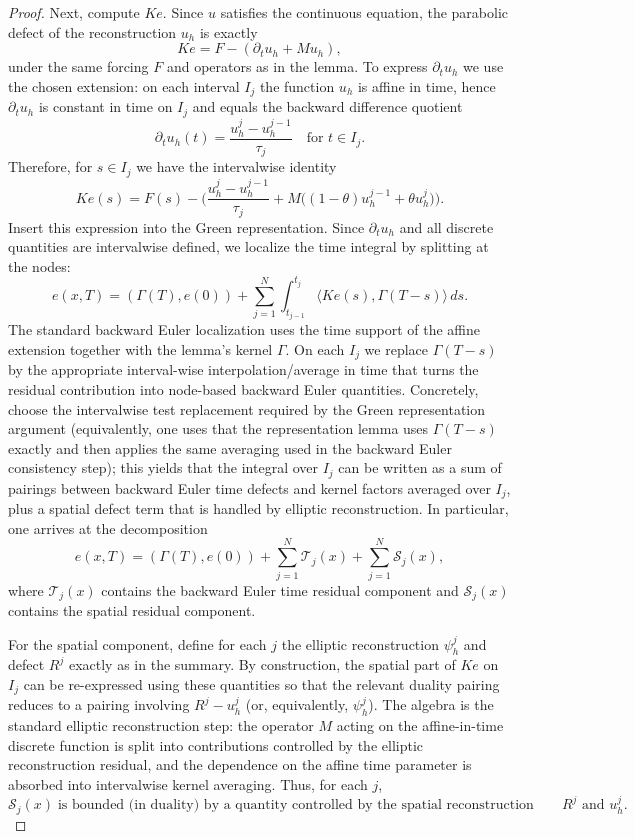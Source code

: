 \documentclass[11pt]{article}
\begin{document}
\begin{proof}
Next, compute $K e$. Since $u$ satisfies the continuous equation, the parabolic defect of the reconstruction $u_h$ is exactly
\[
K e = F-(\partial_t u_h+M u_h),
\]
under the same forcing $F$ and operators as in the lemma. To express $\partial_t u_h$ we use the chosen extension: on each interval $I_j$ the function $u_h$ is affine in time, hence $\partial_t u_h$ is constant in time on $I_j$ and equals the backward difference quotient
\[
\partial_t u_h(t)=\frac{u_h^j-u_h^{j-1}}{\tau_j} \quad \text{for } t\in I_j.
\]
Therefore, for $s\in I_j$ we have the intervalwise identity
\[
K e(s)=F(s)-\Big(\frac{u_h^j-u_h^{j-1}}{\tau_j}+M\big((1-\theta)u_h^{j-1}+\theta u_h^j\big)\Big).
\]
Insert this expression into the Green representation. Since $\partial_t u_h$ and all discrete quantities are intervalwise defined, we localize the time integral by splitting at the nodes:
\[
e(x,T)=(\Gamma(T),e(0))+\sum_{j=1}^N\int_{t_{j-1}}^{t_j}\langle K e(s),\Gamma(T-s)\rangle\,ds.
\]
The standard backward Euler localization uses the time support of the affine extension together with the lemma's kernel $\Gamma$. On each $I_j$ we replace $\Gamma(T-s)$ by the appropriate interval-wise interpolation/average in time that turns the residual contribution into node-based backward Euler quantities. Concretely, choose the intervalwise test replacement required by the Green representation argument (equivalently, one uses that the representation lemma uses $\Gamma(T-s)$ exactly and then applies the same averaging used in the backward Euler consistency step); this yields that the integral over $I_j$ can be written as a sum of pairings between backward Euler time defects and kernel factors averaged over $I_j$, plus a spatial defect term that is handled by elliptic reconstruction. In particular, one arrives at the decomposition
\[
e(x,T)=(\Gamma(T),e(0)) + \sum_{j=1}^N \mathcal T_j(x) + \sum_{j=1}^N \mathcal S_j(x),
\]
where $\mathcal T_j(x)$ contains the backward Euler time residual component and $\mathcal S_j(x)$ contains the spatial residual component.

For the spatial component, define for each $j$ the elliptic reconstruction $\psi_h^j$ and defect $R^j$ exactly as in the summary. By construction, the spatial part of $K e$ on $I_j$ can be re-expressed using these quantities so that the relevant duality pairing reduces to a pairing involving $R^j-u_h^j$ (or, equivalently, $\psi_h^j$). The algebra is the standard elliptic reconstruction step: the operator $M$ acting on the affine-in-time discrete function is split into contributions controlled by the elliptic reconstruction residual, and the dependence on the affine time parameter is absorbed into intervalwise kernel averaging. Thus, for each $j$,
\[
\mathcal S_j(x)\;\text{is bounded (in duality) by a quantity controlled by the spatial reconstruction defect associated with }R^j\text{ and }u_h^j.
\]


\end{proof}
\end{document}

